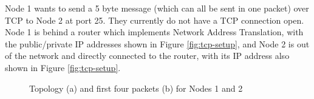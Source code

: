 \documentclass[10pt]{article}
\newenvironment{problem}[2][]{\begin{trivlist}
\item[\hskip \labelsep {\bfseries #1}\hskip \labelsep {\bfseries #2.}]}{\end{trivlist}}
\begin{document}
\begin{problem}{4: TCP Connection}
Node 1 wants to send a 5 byte message (which can all be sent in one packet) over TCP to Node 2 at port 25. They currently do not have a TCP connection open. Node 1 is behind a router which implements Network Address Translation, with the public/private IP addresses shown in Figure \ref{fig:tcp-setup}, and Node 2 is out of the network and directly connected to the router, with its IP address also shown in Figure \ref{fig:tcp-setup}.

\begin{figure}[ht]
\centering

\qquad
{}
\label{fig:tcp}
\caption{Topology (a) and first four packets (b) for Nodes 1 and 2}

\end{figure}


\end{problem}
\end{document}

